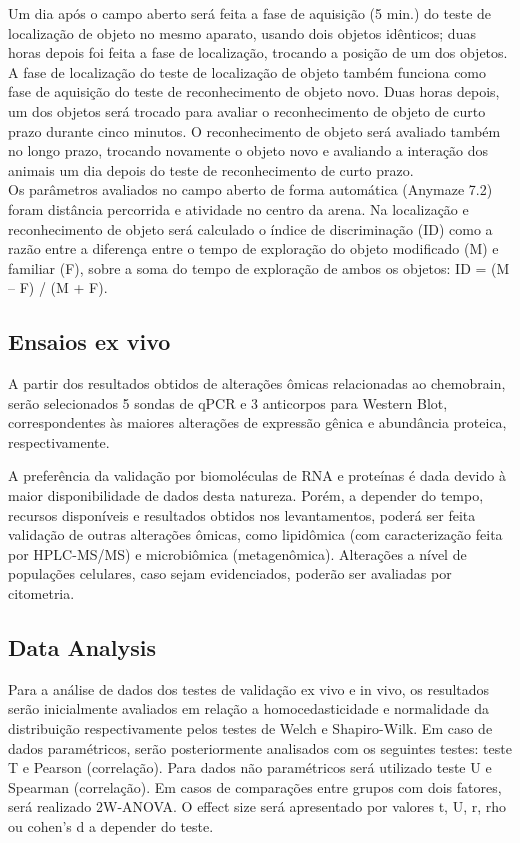 \documentclass[12pt,a4paper]{article}
\begin{document}
Um dia após o campo aberto será feita a fase de aquisição (5 min.) do teste de localização de objeto no mesmo aparato, usando dois objetos idênticos; duas horas depois foi feita a fase de localização, trocando a posição de um dos objetos. A fase de localização do teste de localização de objeto também funciona como fase de aquisição do teste de reconhecimento de objeto novo. Duas horas depois, um dos objetos será trocado para avaliar o reconhecimento de objeto de curto prazo durante cinco minutos. O reconhecimento de objeto será avaliado também no longo prazo, trocando novamente o objeto novo e avaliando a interação dos animais um dia depois do teste de reconhecimento de curto prazo. \\
	
Os parâmetros avaliados no campo aberto de forma automática (Anymaze 7.2) foram distância percorrida e atividade no centro da arena. Na localização e reconhecimento de objeto será calculado o índice de discriminação (ID) como a razão entre a diferença entre o tempo de exploração do objeto modificado (M) e familiar (F), sobre a soma do tempo de exploração de ambos os objetos: ID = (M – F) / (M + F). 
	
	
	
\subsection{Ensaios ex vivo} \indent
	
A partir dos resultados obtidos de alterações ômicas relacionadas ao chemobrain, serão selecionados 5 sondas de qPCR e 3 anticorpos para Western Blot, correspondentes às maiores alterações de expressão gênica e abundância proteica, respectivamente. 

A preferência da validação por biomoléculas de RNA e proteínas é dada devido à maior disponibilidade de dados desta natureza. Porém, a depender do tempo, recursos disponíveis e resultados obtidos nos levantamentos, poderá ser feita validação de outras alterações ômicas, como lipidômica (com caracterização feita por HPLC-MS/MS) e microbiômica (metagenômica). Alterações a nível de populações celulares, caso sejam evidenciados, poderão ser avaliadas por citometria.
	
\subsection{Data Analysis} \indent
	
Para a análise de dados dos testes de validação ex vivo e in vivo, os resultados serão inicialmente avaliados em relação a homocedasticidade e normalidade da distribuição respectivamente pelos testes de Welch e Shapiro-Wilk. Em caso de dados paramétricos, serão posteriormente analisados com os seguintes testes: teste T e Pearson (correlação). Para dados não paramétricos será utilizado teste U e Spearman (correlação). Em casos de comparações entre grupos com dois fatores, será realizado 2W-ANOVA. O effect size será apresentado por valores t, U, r, rho ou cohen’s d a depender do teste.
	
\end{document}
